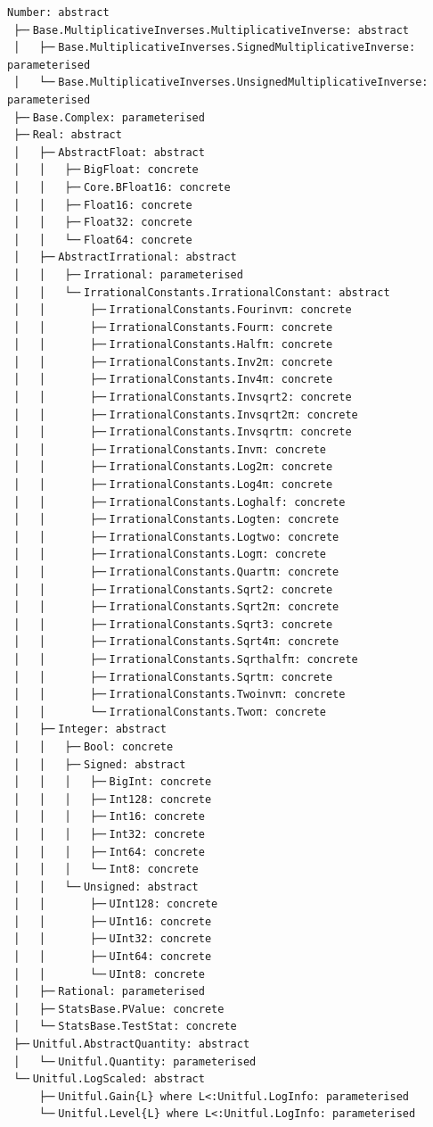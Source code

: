 \documentclass[
]{article}
\begin{document}
\begin{verbatim}
Number: abstract
 ├─╴Base.MultiplicativeInverses.MultiplicativeInverse: abstract
 │   ├─╴Base.MultiplicativeInverses.SignedMultiplicativeInverse: parameterised
 │   └─╴Base.MultiplicativeInverses.UnsignedMultiplicativeInverse: parameterised
 ├─╴Base.Complex: parameterised
 ├─╴Real: abstract
 │   ├─╴AbstractFloat: abstract
 │   │   ├─╴BigFloat: concrete
 │   │   ├─╴Core.BFloat16: concrete
 │   │   ├─╴Float16: concrete
 │   │   ├─╴Float32: concrete
 │   │   └─╴Float64: concrete
 │   ├─╴AbstractIrrational: abstract
 │   │   ├─╴Irrational: parameterised
 │   │   └─╴IrrationalConstants.IrrationalConstant: abstract
 │   │       ├─╴IrrationalConstants.Fourinvπ: concrete
 │   │       ├─╴IrrationalConstants.Fourπ: concrete
 │   │       ├─╴IrrationalConstants.Halfπ: concrete
 │   │       ├─╴IrrationalConstants.Inv2π: concrete
 │   │       ├─╴IrrationalConstants.Inv4π: concrete
 │   │       ├─╴IrrationalConstants.Invsqrt2: concrete
 │   │       ├─╴IrrationalConstants.Invsqrt2π: concrete
 │   │       ├─╴IrrationalConstants.Invsqrtπ: concrete
 │   │       ├─╴IrrationalConstants.Invπ: concrete
 │   │       ├─╴IrrationalConstants.Log2π: concrete
 │   │       ├─╴IrrationalConstants.Log4π: concrete
 │   │       ├─╴IrrationalConstants.Loghalf: concrete
 │   │       ├─╴IrrationalConstants.Logten: concrete
 │   │       ├─╴IrrationalConstants.Logtwo: concrete
 │   │       ├─╴IrrationalConstants.Logπ: concrete
 │   │       ├─╴IrrationalConstants.Quartπ: concrete
 │   │       ├─╴IrrationalConstants.Sqrt2: concrete
 │   │       ├─╴IrrationalConstants.Sqrt2π: concrete
 │   │       ├─╴IrrationalConstants.Sqrt3: concrete
 │   │       ├─╴IrrationalConstants.Sqrt4π: concrete
 │   │       ├─╴IrrationalConstants.Sqrthalfπ: concrete
 │   │       ├─╴IrrationalConstants.Sqrtπ: concrete
 │   │       ├─╴IrrationalConstants.Twoinvπ: concrete
 │   │       └─╴IrrationalConstants.Twoπ: concrete
 │   ├─╴Integer: abstract
 │   │   ├─╴Bool: concrete
 │   │   ├─╴Signed: abstract
 │   │   │   ├─╴BigInt: concrete
 │   │   │   ├─╴Int128: concrete
 │   │   │   ├─╴Int16: concrete
 │   │   │   ├─╴Int32: concrete
 │   │   │   ├─╴Int64: concrete
 │   │   │   └─╴Int8: concrete
 │   │   └─╴Unsigned: abstract
 │   │       ├─╴UInt128: concrete
 │   │       ├─╴UInt16: concrete
 │   │       ├─╴UInt32: concrete
 │   │       ├─╴UInt64: concrete
 │   │       └─╴UInt8: concrete
 │   ├─╴Rational: parameterised
 │   ├─╴StatsBase.PValue: concrete
 │   └─╴StatsBase.TestStat: concrete
 ├─╴Unitful.AbstractQuantity: abstract
 │   └─╴Unitful.Quantity: parameterised
 └─╴Unitful.LogScaled: abstract
     ├─╴Unitful.Gain{L} where L<:Unitful.LogInfo: parameterised
     └─╴Unitful.Level{L} where L<:Unitful.LogInfo: parameterised
\end{verbatim}
\end{document}
